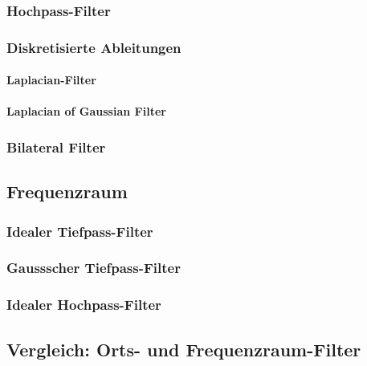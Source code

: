 \documentclass[a4paper, 11pt, accentcolor = tud3b]{tudreport}
\begin{document}
				\subsubsection{Hochpass-Filter} %

				\subsubsection{Diskretisierte Ableitungen} %

					\paragraph{Laplacian-Filter} %

					\paragraph{Laplacian of Gaussian Filter} %

				\subsubsection{Bilateral Filter} %

			\subsection{Frequenzraum} %

				\subsubsection{Idealer Tiefpass-Filter} %

				\subsubsection{Gaussscher Tiefpass-Filter} %

				\subsubsection{Idealer Hochpass-Filter} %

			\subsection{Vergleich: Orts- und Frequenzraum-Filter} %
\end{document}
